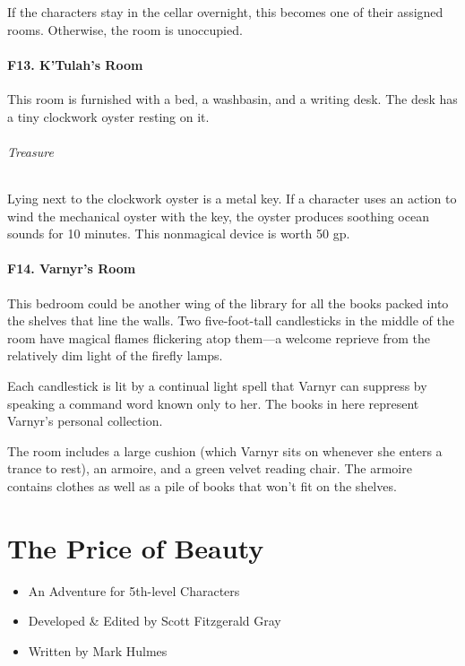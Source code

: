 \documentclass[10pt,a4paper,twoside,bg=print,twocolumn,openany,nodeprecatedcode]{dndbook}
\begin{document}
If the characters stay in the cellar overnight, this becomes one of their assigned rooms. Otherwise, the room is unoccupied.

\subsubsection{F13. K'Tulah's Room}
\begin{DndReadAloud}{}
This room is furnished with a bed, a washbasin, and a writing desk. The desk has a tiny clockwork oyster resting on it.

\end{DndReadAloud}

\subparagraph{Treasure}
Lying next to the clockwork oyster is a metal key. If a character uses an action to wind the mechanical oyster with the key, the oyster produces soothing ocean sounds for 10 minutes. This nonmagical device is worth 50 gp.

\subsubsection{F14. Varnyr's Room}
\begin{DndReadAloud}{}
This bedroom could be another wing of the library for all the books packed into the shelves that line the walls. Two five-foot-tall candlesticks in the middle of the room have magical flames flickering atop them—a welcome reprieve from the relatively dim light of the firefly lamps.

\end{DndReadAloud}

Each candlestick is lit by a continual light spell that Varnyr can suppress by speaking a command word known only to her. The books in here represent Varnyr's personal collection.

The room includes a large cushion (which Varnyr sits on whenever she enters a trance to rest), an armoire, and a green velvet reading chair. The armoire contains clothes as well as a pile of books that won't fit on the shelves.

\chapter{The Price of Beauty}

\begin{itemize}
\item An Adventure for 5th-level Characters
\item Developed \& Edited by Scott Fitzgerald Gray
\item Written by Mark Hulmes
\end{itemize}
\end{document}
